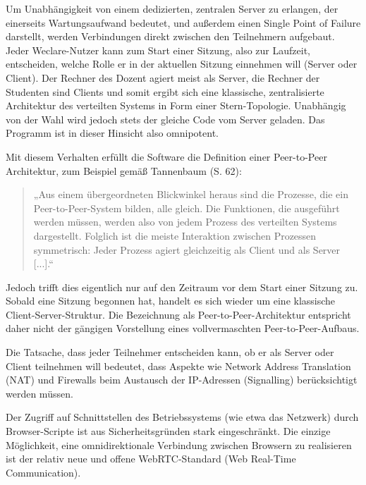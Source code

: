 Um Unabhängigkeit von einem dedizierten, zentralen Server zu erlangen, der einerseits Wartungsaufwand bedeutet, und außerdem einen Single Point of Failure darstellt, werden Verbindungen direkt zwischen den Teilnehmern aufgebaut. Jeder Weclare-Nutzer kann zum Start einer Sitzung, also zur Laufzeit, entscheiden, welche Rolle er in der aktuellen Sitzung einnehmen will (Server oder Client). Der Rechner des Dozent agiert meist als Server, die Rechner der Studenten sind Clients und somit ergibt sich eine klassische, zentralisierte Architektur des verteilten Systems in Form einer Stern-Topologie. Unabhängig von der Wahl wird jedoch stets der gleiche Code vom Server geladen. Das Programm ist in dieser Hinsicht also omnipotent.

Mit diesem Verhalten erfüllt die Software die Definition einer Peer-to-Peer Architektur, zum Beispiel gemäß Tannenbaum (S. 62):

\begin{quotation}
„Aus einem übergeordneten Blickwinkel heraus sind die Prozesse, die ein Peer-to-Peer-System bilden, alle gleich. Die Funktionen, die ausgeführt werden müssen, werden also von jedem Prozess des verteilten Systems dargestellt. Folglich ist die meiste Interaktion zwischen Prozessen symmetrisch: Jeder Prozess agiert gleichzeitig als Client und als Server [...].“
\end{quotation}

Jedoch trifft dies eigentlich nur auf den Zeitraum vor dem Start einer Sitzung zu. Sobald eine Sitzung begonnen hat, handelt es sich wieder um eine klassische Client-Server-Struktur. Die Bezeichnung als Peer-to-Peer-Architektur entspricht daher nicht der gängigen Vorstellung eines vollvermaschten Peer-to-Peer-Aufbaus.

Die Tatsache, dass jeder Teilnehmer entscheiden kann, ob er als Server oder Client teilnehmen will bedeutet, dass Aspekte wie Network Address Translation (NAT) und Firewalls beim Austausch der IP-Adressen (Signalling) berücksichtigt werden müssen.

Der Zugriff auf Schnittstellen des Betriebssystems (wie etwa das Netzwerk) durch Browser-Scripte ist aus Sicherheitsgründen stark eingeschränkt. Die einzige Möglichkeit, eine omnidirektionale Verbindung zwischen Browsern zu realisieren ist der relativ neue und offene WebRTC-Standard (Web Real-Time Communication)\cite{web:webrtc}.


